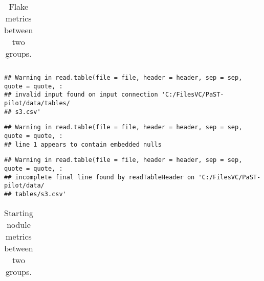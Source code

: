 \documentclass[
  11pt,
]{article}
\begin{document}
\begin{table}[H]

\caption{\label{tab:tab2}Flake metrics between two groups.}
\centering
\fontsize{7}{9}\selectfont
\begin{tabular}[t]{l}
\toprule
\cellcolor{gray!6}{PK...}\\


\bottomrule
\end{tabular}
\end{table}

\begin{verbatim}
## Warning in read.table(file = file, header = header, sep = sep, quote = quote, :
## invalid input found on input connection 'C:/FilesVC/PaST-pilot/data/tables/
## s3.csv'
\end{verbatim}

\begin{verbatim}
## Warning in read.table(file = file, header = header, sep = sep, quote = quote, :
## line 1 appears to contain embedded nulls
\end{verbatim}

\begin{verbatim}
## Warning in read.table(file = file, header = header, sep = sep, quote = quote, :
## incomplete final line found by readTableHeader on 'C:/FilesVC/PaST-pilot/data/
## tables/s3.csv'
\end{verbatim}

\begin{table}[H]

\caption{\label{tab:tab3}Starting nodule metrics between two groups.}
\centering
\fontsize{7}{9}\selectfont
\begin{tabular}[t]{l}
\toprule
\cellcolor{gray!6}{PK...}\\


\bottomrule
\end{tabular}
\end{table}
\end{document}
